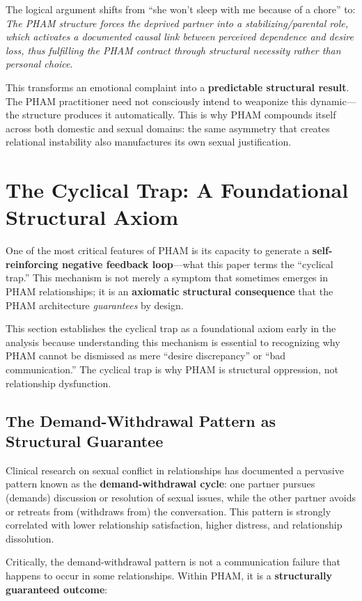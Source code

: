 \documentclass[12pt,openany]{book}
\numberwithin{equation}{chapter}
\begin{document}
The logical argument shifts from ``she won't sleep with me because of a chore'' to: \textit{The PHAM structure forces the deprived partner into a stabilizing/parental role, which activates a documented causal link between perceived dependence and desire loss, thus fulfilling the PHAM contract through structural necessity rather than personal choice}.

This transforms an emotional complaint into a \textbf{predictable structural result}. The PHAM practitioner need not consciously intend to weaponize this dynamic---the structure produces it automatically. This is why PHAM compounds itself across both domestic and sexual domains: the same asymmetry that creates relational instability also manufactures its own sexual justification.

\section{The Cyclical Trap: A Foundational Structural Axiom}

One of the most critical features of PHAM is its capacity to generate a \textbf{self-reinforcing negative feedback loop}---what this paper terms the ``cyclical trap.'' This mechanism is not merely a symptom that sometimes emerges in PHAM relationships; it is an \textbf{axiomatic structural consequence} that the PHAM architecture \textit{guarantees} by design.

This section establishes the cyclical trap as a foundational axiom early in the analysis because understanding this mechanism is essential to recognizing why PHAM cannot be dismissed as mere ``desire discrepancy'' or ``bad communication.'' The cyclical trap is why PHAM is structural oppression, not relationship dysfunction.

\subsection{The Demand-Withdrawal Pattern as Structural Guarantee}

Clinical research on sexual conflict in relationships has documented a pervasive pattern known as the \textbf{demand-withdrawal cycle}: one partner pursues (demands) discussion or resolution of sexual issues, while the other partner avoids or retreats from (withdraws from) the conversation. This pattern is strongly correlated with lower relationship satisfaction, higher distress, and relationship dissolution.

Critically, the demand-withdrawal pattern is not a communication failure that happens to occur in some relationships. Within PHAM, it is a \textbf{structurally guaranteed outcome}:
\end{document}
